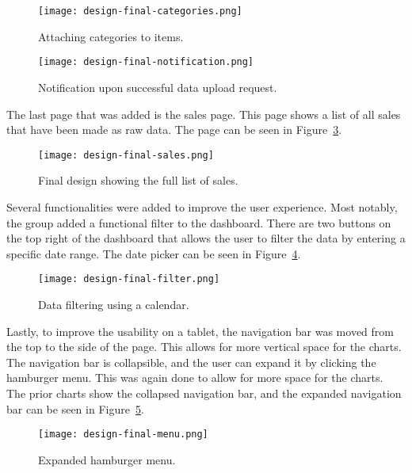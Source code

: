 \begin{figure}[H]
    \centering
    \texttt{[image: design-final-categories.png]}
    \caption{Attaching categories to items.
    }\label{fig:design-final-categories}
\end{figure}

\begin{figure}[H]
    \centering
    \texttt{[image: design-final-notification.png]}
    \caption{Notification upon successful data upload request.
    }\label{fig:design-final-notification}
\end{figure}

The last page that was added is the sales page.
This page shows a list of all sales that have been made as raw data.
The page can be seen in Figure~\ref{fig:design-final-sales}.

\begin{figure}[H]
    \centering
    \texttt{[image: design-final-sales.png]}
    \caption{Final design showing the full list of sales.
    }\label{fig:design-final-sales}
\end{figure}

Several functionalities were added to improve the user experience.
Most notably, the group added a functional filter to the dashboard.
There are two buttons on the top right of the dashboard that allows the user to filter the data by entering a specific
date range.
The date picker can be seen in Figure~\ref{fig:design-final-filter}.

\begin{figure}[H]
    \centering
    \texttt{[image: design-final-filter.png]}
    \caption{Data filtering using a calendar.
    }\label{fig:design-final-filter}
\end{figure}

Lastly, to improve the usability on a tablet, the navigation bar was moved from the top to the side of the page.
This allows for more vertical space for the charts.
The navigation bar is collapsible, and the user can expand it by clicking the hamburger menu.
This was again done to allow for more space for the charts.
The prior charts show the collapsed navigation bar, and the expanded navigation bar can be seen in
Figure~\ref{fig:design-final-menu}.

\begin{figure}[H]
    \centering
    \texttt{[image: design-final-menu.png]}
    \caption{Expanded hamburger menu.
    }\label{fig:design-final-menu}
\end{figure}
